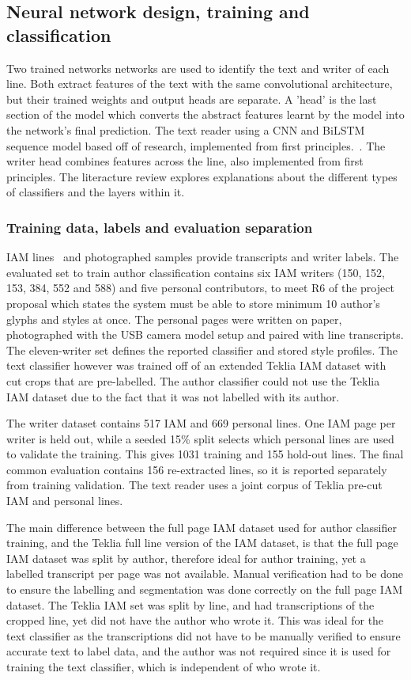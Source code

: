 \subsection{Neural network design, training and classification}
\label{sec:des-class}
Two trained networks networks are used to identify the text and writer of each line. Both extract features of the text with the same convolutional architecture, but their trained weights and output heads are separate. A 'head' is the last section of the model which converts the abstract features learnt by the model into the network's final prediction. The text reader using a CNN and BiLSTM sequence model based off of research, implemented from first principles.~\cite[pp.~4--5]{kizilirmak2023}. The writer head combines features across the line, also implemented from first principles. The literacture review explores explanations about the different types of classifiers and the layers within it.

\subsubsection{Training data, labels and evaluation separation}
IAM lines~\cite{marti2002} and photographed samples provide transcripts and writer labels. The evaluated set to train author classification contains six IAM writers (150, 152, 153, 384, 552 and 588) and five personal contributors, to meet R6 of the project proposal which states the system must be able to store minimum 10 author's glyphs and styles at once. The personal pages were written on paper, photographed with the USB camera model setup and paired with line transcripts. The eleven-writer set defines the reported classifier and stored style profiles. The text classifier however was trained off of an extended Teklia IAM dataset with cut crops that are pre-labelled. The author classifier could not use the Teklia IAM dataset due to the fact that it was not labelled with its author.

The writer dataset contains 517 IAM and 669 personal lines. One IAM page per writer is held out, while a seeded 15\% split selects which personal lines are used to validate the training. This gives 1031 training and 155 hold-out lines. The final common evaluation contains 156 re-extracted lines, so it is reported separately from training validation. The text reader uses a joint corpus of Teklia pre-cut IAM and personal lines. 

The main difference between the full page IAM dataset used for author classifier training, and the Teklia full line version of the IAM dataset, is that the full page IAM dataset was split by author, therefore ideal for author training, yet a labelled transcript per page was not available. Manual verification had to be done to ensure the labelling and segmentation was done correctly on the full page IAM dataset. The Teklia IAM set was split by line, and had transcriptions of the cropped line, yet did not have the author who wrote it. This was ideal for the text classifier as the transcriptions did not have to be manually verified to ensure accurate text to label data, and the author was not required since it is used for training the text classifier, which is independent of who wrote it.

